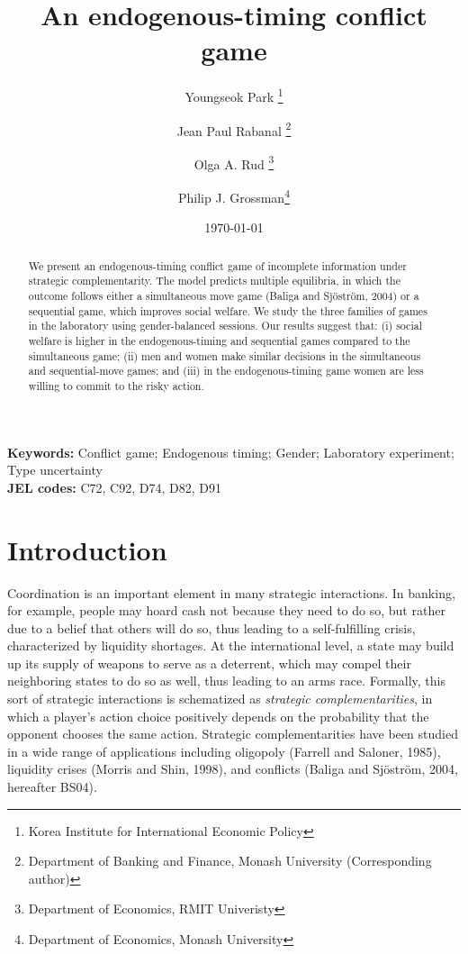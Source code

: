 \documentclass[12pt, letterpaper]{article}
\theoremstyle{plain}
\begin{document}
\newtheorem{Assumption}{Assumption}
\newtheorem{Proposition}{Proposition}
\newtheorem{Corollary}{Corollary}
\newtheorem{Hypothesis}{Hypothesis}
\newtheorem{Result}{Result}


\title{An endogenous-timing conflict game}

\author{Youngseok Park 
\footnote{Korea Institute for International Economic Policy }  \and Jean Paul Rabanal
\thanks{Department of Banking and Finance, Monash University (Corresponding author)}
 \and Olga A. Rud \footnote{Department of Economics, RMIT Univeristy}  \and Philip J. Grossman\thanks{Department of Economics, Monash University } }
\date{\today}
\clearpage\maketitle
\thispagestyle{empty}

\begin{abstract}
\noindent We present an endogenous-timing conflict game of incomplete information under strategic complementarity. The model predicts multiple equilibria, in which the outcome follows either a simultaneous move game (Baliga and Sj\"ostr\"om, 2004) or a sequential game, which improves social welfare. We study the three families of games in the laboratory using gender-balanced sessions. Our results suggest that: (i) social welfare is higher in the endogenous-timing and sequential games compared to the simultaneous game; (ii) men and women make similar decisions in the simultaneous and sequential-move games; and (iii) in the endogenous-timing game women are less willing to commit to the risky action.

\end{abstract}
\textbf{Keywords:}
Conflict game; Endogenous timing; Gender; Laboratory experiment; Type uncertainty \\
\textbf{JEL codes:} C72, C92, D74, D82, D91
\newpage
\section{Introduction}
\label{sec:intro}

Coordination is an important element in many strategic interactions. In banking, for example, people may hoard cash not because they need to do so, but rather due to a belief that others will do so, thus leading to a self-fulfilling crisis, characterized by liquidity shortages. At the international level, a state may build up its supply of weapons to serve as a deterrent, which may compel their neighboring states to do so as well, thus leading to an arms race. Formally, this sort of strategic interactions is schematized as \textit{strategic complementarities}, in which a player's action choice positively depends on the probability that the opponent chooses the same action. Strategic complementarities have been studied in a wide range of applications including oligopoly (Farrell and Saloner, 1985), liquidity crises (Morris and Shin, 1998), and conflicts (Baliga and Sj\"ostr\"om, 2004, hereafter BS04).
\end{document}
